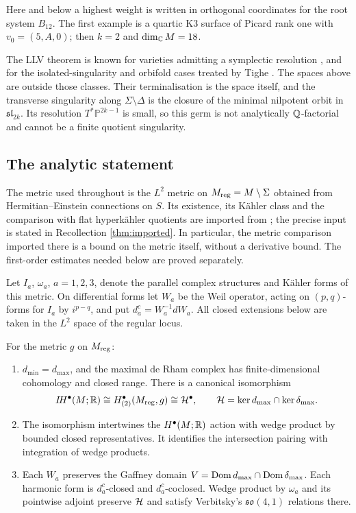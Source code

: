 Here and below a highest weight is written in orthogonal coordinates
for the root system $B_{12}$. The first example is a quartic K3
surface of Picard rank one with $v_0=(5,A,0)$; then $k=2$ and
$\dim_{\mathbb C}M=18$.

The LLV theorem is known for varieties admitting a symplectic
resolution \cite{fsy22}, and for the isolated-singularity and
orbifold cases treated by Tighe \cite{tighe22}. The spaces above
are outside those classes. Their terminalisation is the space
itself, and the transverse singularity along
$\Sigma\setminus\Delta$ is the closure of the minimal nilpotent
orbit in $\mathfrak{sl}_{2k}$. Its resolution
$T^*\mathbb P^{2k-1}$ is small, so this germ is not analytically
$\mathbb Q$-factorial and cannot be a finite quotient singularity.

\subsection{The analytic statement}
The metric used throughout is the $L^2$ metric on
$M_{\mathrm{reg}}=M\setminus\Sigma$ obtained from Hermitian--Einstein
connections on $S$. Its existence, its K\"ahler class and the
comparison with flat hyperk\"ahler quotients are imported from
\cite{wue15,wue20}; the precise input is stated in Recollection
\ref{thm:imported}. In particular, the metric comparison imported
there is a bound on the metric itself, without a derivative bound.
The first-order estimates needed below are proved separately.

Let $I_a$, $\omega_a$, $a=1,2,3$, denote the parallel complex
structures and K\"ahler forms of this metric. On differential forms
let $W_a$ be the Weil operator, acting on $(p,q)$-forms for $I_a$ by
$i^{p-q}$, and put $d_a^c=W_a^{-1}dW_a$. All closed extensions below
are taken in the $L^2$ space of the regular locus.

\begin{theorem}\label{thm:analytic}
For the metric $g$ on $M_{\mathrm{reg}}$:
\begin{enumerate}
\item $d_{\min}=d_{\max}$, and the maximal de Rham complex has
finite-dimensional cohomology and closed range. There is a canonical
isomorphism
\[
 I\!H^\bullet(M;\mathbb R)\cong H^\bullet_{(2)}(M_{\mathrm{reg}},g)
 \cong\mathcal H^\bullet,
 \qquad \mathcal H=\ker d_{\max}\cap\ker\delta_{\max}.
\]
\item The isomorphism intertwines the $H^\bullet(M;\mathbb R)$ action
with wedge product by bounded closed representatives. It identifies
the intersection pairing with integration of wedge products.
\item Each $W_a$ preserves the Gaffney domain
$V=\operatorname{Dom} d_{\max}\cap\operatorname{Dom}\delta_{\max}$. Each harmonic form is
$d_a^c$-closed and $d_a^c$-coclosed. Wedge product by $\omega_a$ and
its pointwise adjoint preserve $\mathcal H$ and satisfy Verbitsky's
$\mathfrak{so}(4,1)$ relations there.
\end{enumerate}
\end{theorem}

